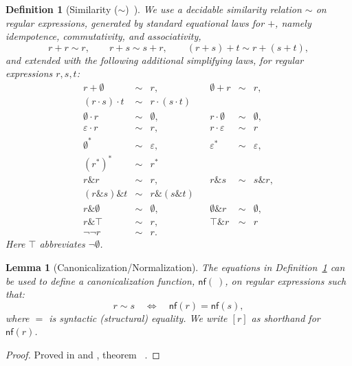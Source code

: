 \documentclass{article}
\newtheorem{definition}{Definition}[section]
\newtheorem{lemma}{Lemma}[section]
\begin{document}
\begin{definition}[Similarity ($\sim$)~\cite{CoquandRegexEquality}]
\label{def:similarity}
We use a decidable \emph{similarity} relation $\sim$ on regular expressions,
generated by standard equational laws for $+$, namely idempotence,
commutativity, and associativity,
\[
r+r \sim r,
\qquad
r+s \sim s+r,
\qquad
(r+s)+t \sim r+(s+t),
\]
and extended with the following additional simplifying laws, for regular
expressions $r,s,t$:
\[
\begin{array}{rclcrcl}
r+\emptyset &\sim& r, &&
\emptyset+r &\sim& r,\\[0.6ex]

(r\cdot s)\cdot t &\sim& r\cdot(s\cdot t)\\[0.4ex]
\emptyset\cdot r &\sim& \emptyset, &&
r\cdot\emptyset &\sim& \emptyset,\\[0.4ex]
\varepsilon\cdot r &\sim& r, &&
r\cdot\varepsilon &\sim& r\\[0.8ex]

\emptyset^* &\sim& \varepsilon, &&
\varepsilon^* &\sim& \varepsilon,\\[0.4ex]
(r^*)^* &\sim& r^*
\\[0.8ex]

r\&r &\sim& r, &&
r\&s &\sim& s\&r,\\[0.4ex]
(r\&s)\&t &\sim& r\&(s\&t)\\[0.4ex]
r\&\emptyset &\sim& \emptyset, &&
\emptyset\&r &\sim& \emptyset,\\[0.4ex]
r\&\top &\sim& r, &&
\top\&r &\sim& r\\[0.8ex]

\neg\neg r &\sim& r.
\end{array}
\]
Here $\top$ abbreviates $\neg\emptyset$. 
\end{definition}

\begin{lemma}[Canonicalization/Normalization]\label{def:canonize}
The equations in Definition~\ref{def:similarity} can be used to define a
{\em canonicalization function}, $\mathsf{nf}(\ )$, on regular expressions such that:
\[
  r \sim s \quad\Longleftrightarrow\quad \mathsf{nf}(r)=\mathsf{nf}(s),
\]
where $=$ is syntactic (structural) equality.
We write $[r]$ as shorthand for $\mathsf{nf}(r)$.
\end{lemma}
\begin{proof}
\begin{sloppypar}
Proved in  and
, theorem
~\cite{OurRocqRepo}.
\end{sloppypar}
\end{proof}
\end{document}
